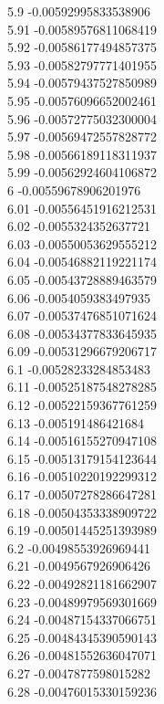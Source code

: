 {5.9	-0.00592995833538906\\
5.91	-0.00589576811068419\\
5.92	-0.00586177494857375\\
5.93	-0.00582797771401955\\
5.94	-0.00579437527850989\\
5.95	-0.00576096652002461\\
5.96	-0.00572775032300004\\
5.97	-0.00569472557828772\\
5.98	-0.00566189118311937\\
5.99	-0.00562924604106872\\
6	-0.00559678906201976\\
6.01	-0.00556451916212531\\
6.02	-0.0055324352637721\\
6.03	-0.00550053629555212\\
6.04	-0.00546882119221174\\
6.05	-0.00543728889463579\\
6.06	-0.0054059383497935\\
6.07	-0.00537476851071624\\
6.08	-0.00534377833645935\\
6.09	-0.00531296679206717\\
6.1	-0.00528233284853483\\
6.11	-0.00525187548278285\\
6.12	-0.00522159367761259\\
6.13	-0.005191486421684\\
6.14	-0.00516155270947108\\
6.15	-0.00513179154123644\\
6.16	-0.00510220192299312\\
6.17	-0.00507278286647281\\
6.18	-0.00504353338909722\\
6.19	-0.00501445251393989\\
6.2	-0.00498553926969441\\
6.21	-0.0049567926906426\\
6.22	-0.00492821181662907\\
6.23	-0.00489979569301669\\
6.24	-0.00487154337066751\\
6.25	-0.00484345390590143\\
6.26	-0.00481552636047071\\
6.27	-0.0047877598015282\\
6.28	-0.00476015330159236\\
}
